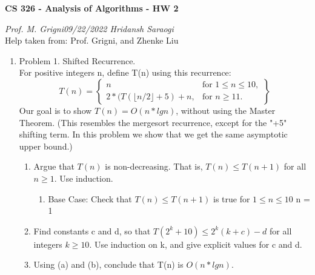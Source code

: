 \documentclass[11pt]{article}
\begin{document}
\begin{center}
    \textbf{CS 326 - Analysis of Algorithms - HW 2}\\
\end{center}


\begin{flushleft}
    \textit{Prof. M. Grigni\hfill09/22/2022 \hfill Hridansh Saraogi} \\
    \vspace{0.15cm}
    \small {Help taken from: Prof. Grigni, and Zhenke Liu}
\end{flushleft}


\begin{enumerate}

\item Problem 1. Shifted Recurrence. \\
For positive integers n, define T(n) using this recurrence:
\begin{equation}
T(n) = 
\left\{
    \begin{array}{lr}
        n & \text{for }  1 \leq n \leq 10,\\
        2*(T( \lfloor n/2 \rfloor + 5)+n, & \text{for } n\geq 11.
    \end{array}
\right\}
\end{equation}
Our goal is to show $T(n) = O(n*lg n)$, without using the Master Theorem. (This resembles the mergesort recurrence, except for the "+5" shifting term. In this problem we show that we get the same asymptotic upper bound.)

    \begin{enumerate}
        \item Argue that $T(n)$ is non-decreasing. That is, $T(n) \leq T(n+1)$ for all $n \geq 1$. Use induction.
        
        \begin{enumerate}
            \item Base Case: Check that $T(n) \leq T(n+1)$ is true for $1 \leq n \leq 10$
            n = 1
        \end{enumerate}

        \item Find constants c and d, so that $T(2^k+10) \leq 2^k(k+c)-d$ for all integers $k \geq 10$. Use induction on k, and give explicit values for c and d.

        \item Using (a) and (b), conclude that T(n) is $O(n* lg n)$.
        

\end{enumerate}
\end{enumerate}
\end{document}

